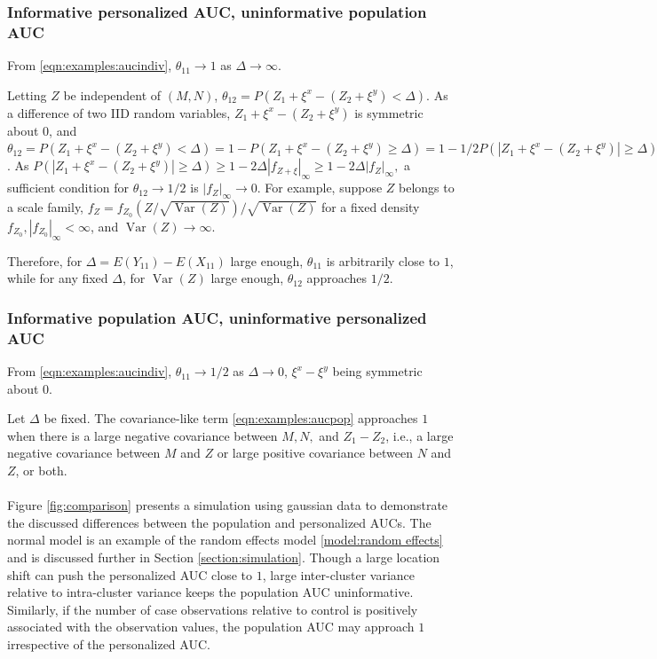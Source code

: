 \documentclass[12pt]{article}
\DeclareMathOperator{\AUC}{AUC}
\DeclareMathOperator{\V}{Var}
\newcommand{\E}{E}
\renewcommand{\P}{P}
\newcommand{\cind}{\perp \!\!\! \perp}
\newcommand{\aucindiv}{\theta_{11}}%
\newcommand{\aucpop}{\theta_{12}}%
\begin{document}
\subsubsection{Informative personalized AUC, uninformative population AUC}

From \eqref{eqn:examples:aucindiv}, $\aucindiv \to 1$ as $\Delta\to\infty$.

Letting $Z$ be independent of $(M,N)$,
$\aucpop=\P( Z_1+\xi^x - (Z_2+\xi^y) < \Delta)$. As a difference of
two IID random variables, $Z_1+\xi^x - (Z_2+\xi^y)$ is symmetric about
$0$, and
$\aucpop=\P(Z_1+\xi^x - (Z_2+\xi^y)<\Delta)=1-\P(Z_1+\xi^x - (Z_2+\xi^y)\ge\Delta)=1-1/2\P(|Z_1+\xi^x - (Z_2+\xi^y)|\ge\Delta)$. %
As $P(|Z_1+\xi^x - (Z_2+\xi^y)|\ge\Delta)\ge 1-2\Delta|f_{Z+\xi}|_\infty\ge 1-2\Delta|f_Z|_\infty,$ a sufficient condition for $\aucpop\to1/2$ is $|f_Z|_\infty\to 0$. For example, suppose $Z$ belongs to a scale
family, $f_Z = f_{Z_0}(Z/\sqrt{\V(Z)})/\sqrt{\V(Z)}$ for a fixed
density $f_{Z_0}, |f_{Z_0}|_{\infty}<\infty$, and $\V(Z)\to\infty$.

Therefore, for $\Delta=\E(Y_{11})-\E(X_{11})$ large enough, $\aucindiv$ is arbitrarily close to $1$, while for any fixed $\Delta$, for $\V(Z)$ large enough, $\aucpop$ approaches $1/2$.

\subsubsection{Informative population AUC, uninformative personalized AUC}

From \eqref{eqn:examples:aucindiv},  $\aucindiv\to 1/2$ as $\Delta\to 0$,
$\xi^x-\xi^y$ being symmetric about $0$.

Let $\Delta$ be fixed. The covariance-like term
\eqref{eqn:examples:aucpop} approaches $1$ when there is a large
negative covariance between $M,N,$ and $Z_1-Z_2$, i.e., a large
negative covariance between $M$ and $Z$ or large positive covariance
between $N$ and $Z$, or both.
\\\\
Figure \ref{fig:comparison} presents a simulation using gaussian data
to demonstrate the discussed differences between the population and
personalized AUCs. The normal model is an example of the random effects
model \eqref{model:random effects} and is discussed further in Section
\ref{section:simulation}. Though a large location shift can push the
personalized AUC close to $1$, large inter-cluster variance relative to
intra-cluster variance keeps the population AUC
uninformative. Similarly, if the number of case observations relative
to control is positively associated with the observation values, the
population AUC may approach $1$ irrespective of the personalized AUC.
\end{document}
